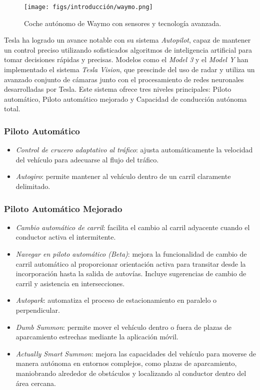 \begin{figure}[ht]
  \begin{center}
    \texttt{[image: figs/introducción/waymo.png]}
  \end{center}
  \caption{Coche autónomo de Waymo con sensores y tecnología avanzada.}
  \label{waymo}
\end{figure}

Tesla ha logrado un avance notable con su sistema \textit{Autopilot}, capaz de mantener un control preciso utilizando sofisticados algoritmos de inteligencia artificial para tomar decisiones rápidas y precisas. Modelos como el \textit{Model 3} y el \textit{Model Y} han implementado el sistema \textit{Tesla Vision}, que prescinde del uso de radar y utiliza un avanzado conjunto de cámaras junto con el procesamiento de redes neuronales desarrolladas por Tesla. Este sistema ofrece tres niveles principales: Piloto automático, Piloto automático mejorado y Capacidad de conducción autónoma total.

\subsubsection{Piloto Automático}

\begin{itemize}
    \item \textit{Control de crucero adaptativo al tráfico}: ajusta automáticamente la velocidad del vehículo para adecuarse al flujo del tráfico.
    \item \textit{Autogiro}: permite mantener al vehículo dentro de un carril claramente delimitado.
\end{itemize}

\subsubsection{Piloto Automático Mejorado}

\begin{itemize}
    \item \textit{Cambio automático de carril}: facilita el cambio al carril adyacente cuando el conductor activa el intermitente.
    \item \textit{Navegar en piloto automático (Beta)}: mejora la funcionalidad de cambio de carril automático al proporcionar orientación activa para transitar desde la incorporación hasta la salida de autovías. Incluye sugerencias de cambio de carril y asistencia en intersecciones.
    \item \textit{Autopark}: automatiza el proceso de estacionamiento en paralelo o perpendicular.
    \item \textit{Dumb Summon}: permite mover el vehículo dentro o fuera de plazas de aparcamiento estrechas mediante la aplicación móvil.
    \item \textit{Actually Smart Summon}: mejora las capacidades del vehículo para moverse de manera autónoma en entornos complejos, como plazas de aparcamiento, maniobrando alrededor de obstáculos y localizando al conductor dentro del área cercana.
\end{itemize}


